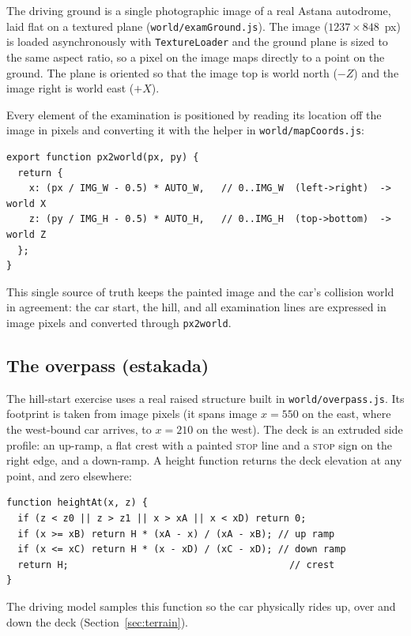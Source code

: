 \documentclass[11pt]{article}
\newcommand{\code}[1]{\texttt{#1}}
\begin{document}
The driving ground is a single photographic image of a real Astana autodrome,
laid flat on a textured plane (\code{world/examGround.js}). The image
($1237\times848$~px) is loaded asynchronously with \code{TextureLoader} and the
ground plane is sized to the same aspect ratio, so a pixel on the image maps
directly to a point on the ground. The plane is oriented so that the image top
is world north ($-Z$) and the image right is world east ($+X$).

Every element of the examination is positioned by reading its location off the
image in pixels and converting it with the helper in \code{world/mapCoords.js}:

\begin{lstlisting}[caption={Pixel-to-world mapping (\code{mapCoords.js}).}]
export function px2world(px, py) {
  return {
    x: (px / IMG_W - 0.5) * AUTO_W,   // 0..IMG_W  (left->right)  -> world X
    z: (py / IMG_H - 0.5) * AUTO_H,   // 0..IMG_H  (top->bottom)  -> world Z
  };
}
\end{lstlisting}

This single source of truth keeps the painted image and the car's collision world
in agreement: the car start, the hill, and all examination lines are expressed in
image pixels and converted through \code{px2world}.

\subsection{The overpass (estakada)}

The hill-start exercise uses a real raised structure built in
\code{world/overpass.js}. Its footprint is taken from image pixels (it spans
image $x=550$ on the east, where the west-bound car arrives, to $x=210$ on the
west). The deck is an extruded side profile: an up-ramp, a flat crest with a
painted \textsc{stop} line and a \textsc{stop} sign on the right edge, and a
down-ramp. A height function returns the deck elevation at any point, and zero
elsewhere:

\begin{lstlisting}[caption={Overpass deck height (\code{overpass.js}).}]
function heightAt(x, z) {
  if (z < z0 || z > z1 || x > xA || x < xD) return 0;
  if (x >= xB) return H * (xA - x) / (xA - xB); // up ramp
  if (x <= xC) return H * (x - xD) / (xC - xD); // down ramp
  return H;                                       // crest
}
\end{lstlisting}

The driving model samples this function so the car physically rides up, over and
down the deck (Section~\ref{sec:terrain}).
\end{document}
